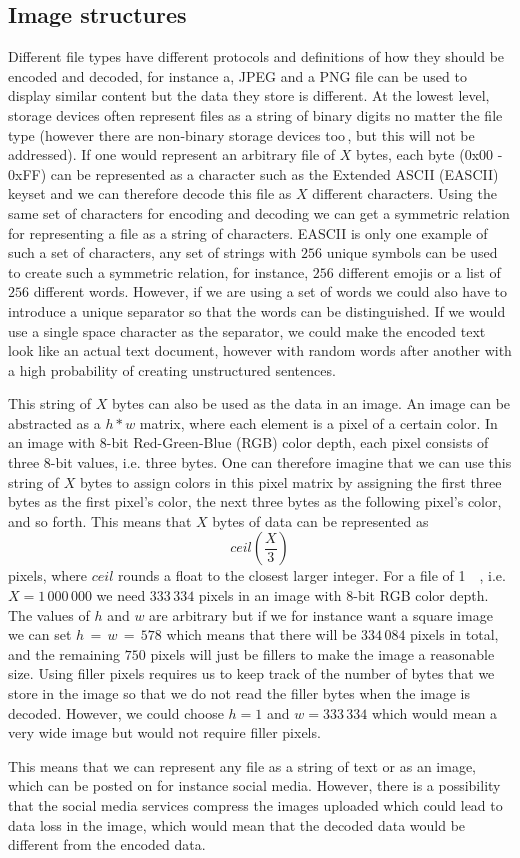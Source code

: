 \subsection{Image structures}
Different file types have different protocols and definitions of how they should be encoded and decoded, for instance a, JPEG and a PNG file can be used to display similar content but the data they store is different. At the lowest level, storage devices often represent files as a string of binary digits no matter the file type (however there are non-binary storage devices too\,\cite{MultistateDataStorage2020}, but this will not be addressed). If one would represent an arbitrary file of $X$ bytes, each byte (0x00 - 0xFF) can be represented as a character such as the Extended ASCII (EASCII) keyset and we can therefore decode this file as $X$ different characters. Using the same set of characters for encoding and decoding we can get a symmetric relation for representing a file as a string of characters. EASCII is only one example of such a set of characters, any set of strings with $256$ unique symbols can be used to create such a symmetric relation, for instance, $256$ different emojis or a list of $256$ different words. However, if we are using a set of words we could also have to introduce a unique separator so that the words can be distinguished. If we would use a single space character as the separator, we could make the encoded text look like an actual text document, however with random words after another with a high probability of creating unstructured sentences.

This string of $X$ bytes can also be used as the data in an image. An image can be abstracted as a $h * w$ matrix, where each element is a pixel of a certain color. In an image with 8-bit Red-Green-Blue (RGB) color depth, each pixel consists of three 8-bit values, i.e. three bytes. One can therefore imagine that we can use this string of $X$ bytes to assign colors in this pixel matrix by assigning the first three bytes as the first pixel's color, the next three bytes as the following pixel's color, and so forth. This means that $X$ bytes of data can be represented as 
$$ceil(\frac{X}{3})$$ 
pixels, where $ceil$ rounds a float to the closest larger integer. For a file of \SI{1}{\mega\byte}, i.e. $X = 1\,000\,000$ we need $333\,334$ pixels in an image with 8-bit RGB color depth. The values of $h$ and $w$ are arbitrary but if we for instance want a square image we can set $ h\,=\,w\,=\,578$ which means that there will be $334\,084$ pixels in total, and the remaining $750$ pixels will just be fillers to make the image a reasonable size. Using filler pixels requires us to keep track of the number of bytes that we store in the image so that we do not read the filler bytes when the image is decoded. However, we could choose $h = 1$ and $w = 333\,334$ which would mean a very wide image but would not require filler pixels. 

This means that we can represent any file as a string of text or as an image, which can be posted on for instance social media. However, there is a possibility that the social media services compress the images uploaded which could lead to data loss in the image, which would mean that the decoded data would be different from the encoded data.